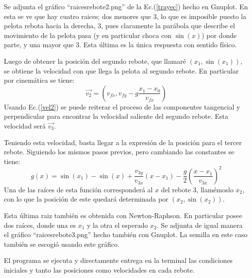 \documentclass[12pt]{article}
\begin{document}
\begin{itemize}
Se adjunta el gráfico ``raicesrebote2.png'' de la Ec.(\ref{trayec}) hecho en Gnuplot. En esta se ve que hay cuatro raices; dos menores que $3$, lo que es imposible puesto la pelota rebota hacia la derecha, $3$, pues claramente la parábola que describe el movimiento de la pelota pasa (y en particular choca con $\sin(x)$) por donde parte, y una mayor que $3$. Esta última es la única respuesta con sentido físico.

Luego de obtener la posición del segundo rebote, que llamaré $(x_1,\sin(x_1))$, se obtiene la velocidad con que llega la pelota al segundo rebote. En particular por cinemática se tiene:
\begin{equation}
\label{vel2}
\vec{v_2}=\left(v_{fx},v_{fy}-g\frac{x_1-x_0}{v_{fx}}\right)
\end{equation}
Usando Ec.(\ref{vel2}) se puede reiterar el proceso de las componentes tangencial y perpendicular para encontrar la velocidad saliente del segundo rebote. Esta velocidad será $\vec{v_3}$.

Teniendo esta velocidad, basta llegar a la expresión de la posición para el tercer rebote. Siguiendo los mismos pasos previos, pero cambiando las constantes se tiene:
\begin{equation*}
g(x)=\sin(x_1)-\sin(x)+\frac{v_{3y}}{v_{3x}}(x-x_1)-\frac{g}{2}\left(\frac{x-x_1}{v_{3x}}\right)^2
\end{equation*}
Una de las raíces de esta función corresponderá al $x$ del rebote 3, llamémoslo $x_2$, con lo que la posición de este quedará determinada por $(x_2,\sin(x_2))$.

Esta última raiz también es obtenida con Newton-Raphson. En particular posee dos raíces, donde una es $x_1$ y la otra el esperado $x_2$. Se adjunta de igual manera el gráfico ``raicesrebote3.png'' hecho también con Gnuplot. La semilla en este caso también se escogió usando este gráfico.

El programa se ejecuta y directamente entrega en la terminal las condiciones iniciales y tanto las posiciones como velocidades en cada rebote.
\end{itemize}
\end{document}
